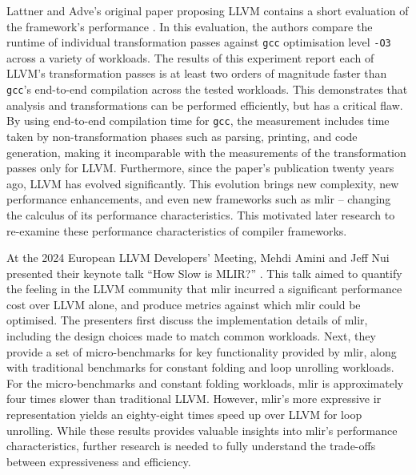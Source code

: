 Lattner and Adve's original paper proposing LLVM contains a short evaluation of the framework's performance \cite[Section 4.1.4]{lattnerLLVMCompilationFramework2004}.
In this evaluation, the authors compare the runtime of individual transformation passes against \texttt{gcc} optimisation level \texttt{-O3} across a variety of workloads.
The results of this experiment \cite[Table 2]{lattnerLLVMCompilationFramework2004} report each of LLVM's transformation passes is at least two orders of magnitude faster than \texttt{gcc}'s end-to-end compilation across the tested workloads. This demonstrates that analysis and transformations can be performed efficiently, but has a critical flaw. By using end-to-end compilation time for \texttt{gcc}, the measurement includes time taken by non-transformation phases such as parsing, printing, and code generation, making it incomparable with the measurements of the transformation passes only for LLVM.
Furthermore, since the paper's publication twenty years ago, LLVM has evolved significantly. This evolution brings new complexity, new performance enhancements, and even new frameworks such as \ac{mlir} -- changing the calculus of its performance characteristics.
This motivated later research to re-examine these performance characteristics of compiler frameworks.

At the 2024 European LLVM Developers' Meeting, Mehdi Amini and Jeff Nui presented their keynote talk ``How Slow is MLIR?'' \cite{aminiHowSlowMLIR2024}.
This talk aimed to quantify the feeling in the LLVM community that \ac{mlir} incurred a significant performance cost over LLVM alone, and produce metrics against which \ac{mlir} could be optimised.
The presenters first discuss the implementation details of \ac{mlir}, including the design choices made to match common workloads.
Next, they provide a set of micro-benchmarks for key functionality provided by \ac{mlir}, along with traditional benchmarks for constant folding and loop unrolling workloads. For the micro-benchmarks and constant folding workloads, \ac{mlir} is approximately four times slower than traditional LLVM. However, \ac{mlir}'s more expressive \ac{ir} representation yields an eighty-eight times speed up over LLVM for loop unrolling.
While these results provides valuable insights into \ac{mlir}'s performance characteristics, further research is needed to fully understand the trade-offs between expressiveness and efficiency.

